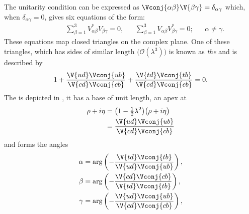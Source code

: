 The unitarity condition can be expressed as
$\Vconj{\alpha\beta}\V{\beta\gamma}=\delta_{\alpha\gamma}$
which, when $\delta_{\alpha\gamma}=0$, gives six equations of the form:
\begin{align}
  \phantom{\beta\neq\gamma}
  &&\sum_{\beta=1}^3V_{\alpha\beta}^*V_{\beta\gamma}^{\phantom{*}} = 0,
  &&\sum_{\beta=1}^3V_{\alpha\beta}^{\phantom{*}}V_{\beta\gamma}^*=0;
  &&\alpha\neq\gamma.
  \label{eq:th:offdiag}
\end{align}
These equations map closed triangles on the complex plane.
One of these triangles, which has sides of similar length
$\big(\mathcal{O}(\lambda^3)\big)$
is known as \emph{the} \ut and is described by
\begin{equation}
  1 + \frac{\V{ud}\Vconj{ub}}{\V{cd}\Vconj{cb}} + \frac{\V{td}\Vconj{tb}}{\V{cd}\Vconj{cb}} = 0.
  \label{eq:th:ut}
\end{equation}
The \ut is depicted in , it has a base of unit length, an apex at
\begin{align}
  \bar\rho+i\bar\eta &= \big(1-\tfrac12\lambda^2\big)\big(\rho+i\eta\big)
  \nonumber\\
  &=\frac{\V{ud}\Vconj{ub}}{\V{cd}\Vconj{cb}}
\end{align}
and forms the angles
\begin{align}
  \alpha &= \arg\left(-\frac{\V{td}\Vconj{tb}}{\V{ud}\Vconj{ub}}\right), \nonumber\\
  \beta  &= \arg\left(-\frac{\V{cd}\Vconj{cb}}{\V{td}\Vconj{tb}}\right), \nonumber\\
  \gamma &= \arg\left(-\frac{\V{ud}\Vconj{ub}}{\V{cd}\Vconj{cb}}\right),
\end{align}
